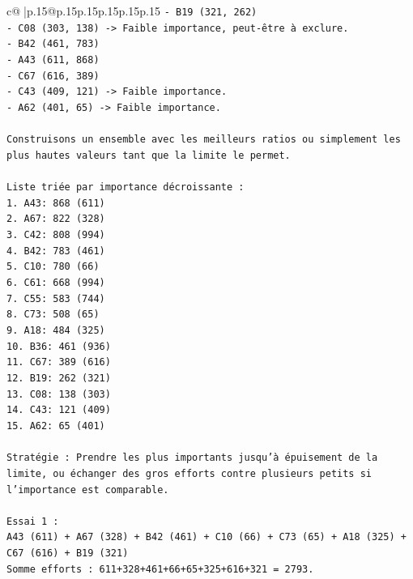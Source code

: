 \documentclass{article}
\begin{document}
{\begin{supertabular}{c@{$\;$}|p{.15\linewidth}@{}p{.15\linewidth}p{.15\linewidth}p{.15\linewidth}p{.15\linewidth}p{.15\linewidth}}
{{{\texttt{{-} B19 (321, 262)} \\
\texttt{{-} C08 (303, 138) {-}> Faible importance, peut{-}être à exclure.} \\
\texttt{{-} B42 (461, 783)} \\
\texttt{{-} A43 (611, 868)} \\
\texttt{{-} C67 (616, 389)} \\
\texttt{{-} C43 (409, 121) {-}> Faible importance.} \\
\texttt{{-} A62 (401, 65) {-}> Faible importance.} \\
\\ 
\texttt{Construisons un ensemble avec les meilleurs ratios ou simplement les plus hautes valeurs tant que la limite le permet.} \\
\\ 
\texttt{Liste triée par importance décroissante :} \\
\texttt{1. A43: 868 (611)} \\
\texttt{2. A67: 822 (328)} \\
\texttt{3. C42: 808 (994)} \\
\texttt{4. B42: 783 (461)} \\
\texttt{5. C10: 780 (66)} \\
\texttt{6. C61: 668 (994)} \\
\texttt{7. C55: 583 (744)} \\
\texttt{8. C73: 508 (65)} \\
\texttt{9. A18: 484 (325)} \\
\texttt{10. B36: 461 (936)} \\
\texttt{11. C67: 389 (616)} \\
\texttt{12. B19: 262 (321)} \\
\texttt{13. C08: 138 (303)} \\
\texttt{14. C43: 121 (409)} \\
\texttt{15. A62: 65 (401)} \\
\\ 
\texttt{Stratégie : Prendre les plus importants jusqu'à épuisement de la limite, ou échanger des gros efforts contre plusieurs petits si l'importance est comparable.} \\
\\ 
\texttt{Essai 1 :} \\
\texttt{A43 (611) + A67 (328) + B42 (461) + C10 (66) + C73 (65) + A18 (325) + C67 (616) + B19 (321)} \\
\texttt{Somme efforts : 611+328+461+66+65+325+616+321 = 2793.} \\
}}}
\end{supertabular}}
\end{document}
